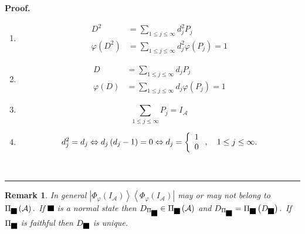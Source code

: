 \documentclass[aps,preprint]{revtex4}%
\providecommand{\U}[1]{\protect\rule{.1in}{.1in}}
\newtheorem{remark}[theorem]{Remark}
\newenvironment{proof}[1][Proof]{\noindent\textbf{#1.} }{\ \rule{0.5em}{0.5em}}
\begin{document}
\begin{proof}
\begin{enumerate}
\item
\begin{align}
D^{2}  &  =\sum_{1\leq j\leq\infty}d_{j}^{2}P_{j}\\
\varphi\left(  D^{2}\right)   &  =\sum_{1\leq j\leq\infty}d_{j}^{2}%
\varphi\left(  P_{j}\right)  =1
\end{align}


\item
\begin{align}
D  &  =\sum_{1\leq j\leq\infty}d_{j}P_{j}\\
\varphi\left(  D\right)   &  =\sum_{1\leq j\leq\infty}d_{j}\varphi\left(
P_{j}\right)  =1
\end{align}


\item
\begin{equation}
\sum_{1\leq j\leq\infty}P_{j}=I_{\mathcal{A}}%
\end{equation}


\item
\begin{equation}
d_{j}^{2}=d_{j}\Leftrightarrow d_{j}\left(  d_{j}-1\right)  =0\Leftrightarrow
d_{j}=\left\{
\begin{array}
[c]{c}%
1\\
0
\end{array}
\right.  ,\quad1\leq j\leq\infty.
\end{equation}

\end{enumerate}
\end{proof}

\begin{remark}
In general $\left\vert \Phi_{\varphi}\left(  I_{\mathcal{A}}\right)
\right\rangle \left\langle \Phi_{\varphi}\left(  I_{\mathcal{A}}\right)
\right\vert $ \emph{may or may not belong to} $\Pi_{\U{3c6} }\left(
\mathcal{A}\right)  .$ If $\U{3c6} $ is a normal state then $D_{\Pi_{\U{3c6}
}}\in\Pi_{\U{3c6} }\left(  \mathcal{A}\right)  $ and $D_{\Pi_{\U{3c6} }}%
=\Pi_{\U{3c6} }\left(  D_{\U{3c6} }\right)  .$ If $\Pi_{\U{3c6} }$ is faithful
then $D_{\U{3c6} }$ is unique.
\end{remark}
\end{document}
